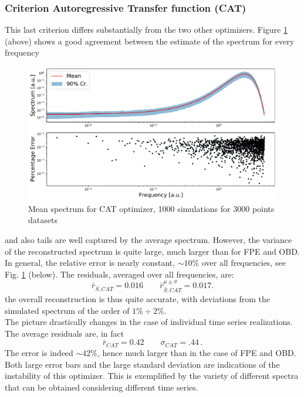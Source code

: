 \documentclass[twocolumn,showpacs,preprintnumbers,nofootinbib,prd,
superscriptaddress,10pt]{revtex4-1}
\begin{document}
\subsubsection{Criterion Autoregressive Transfer function (CAT)}
This last criterion differs substantially from the two other optimizers. Figure \ref{fig:CATmean} (above) shows a good agreement between the estimate of the spectrum for every frequency
\begin{figure}[H]
    \centering
    \includegraphics[width = \linewidth]{Images/CAT/CATnormal.pdf}
    \caption{Mean spectrum for CAT optimizer, 1000 simulations for 3000 points datasets}
    \label{fig:CATmean}
\end{figure} and also tails are well captured by the average spectrum. However, the variance of the reconstructed spectrum is quite large, much larger than for FPE and OBD. In general, the relative error is nearly constant, $\sim 10\%$ over all frequencies, see  Fig. \ref{fig:CATmean} (below). The residuals, averaged over all frequencies, are: 
\begin{equation}
    \nonumber
    \bar r_{\bar S, CAT} = 0.016 \qquad \bar r^{\mu \pm \sigma}_{\bar S, CAT} = 0.017.
\end{equation}
the overall reconstruction is thus quite accurate, with deviations from the simulated spectrum of the order of $1\% \div 2\%$.\\
The picture drastically changes in the case of individual time series realizations. The average residuals are, in fact
\begin{equation}
    \bar r_{CAT} = 0.42 \qquad \sigma_{CAT} = .44\,.
\end{equation}
The error is indeed $\sim 42\%$, hence much larger than in the case of FPE and OBD. Both large error bars and the large standard deviation are indications of the instability of this optimizer. This is exemplified by the variety of different spectra that can be obtained considering different time series. 
\end{document}
